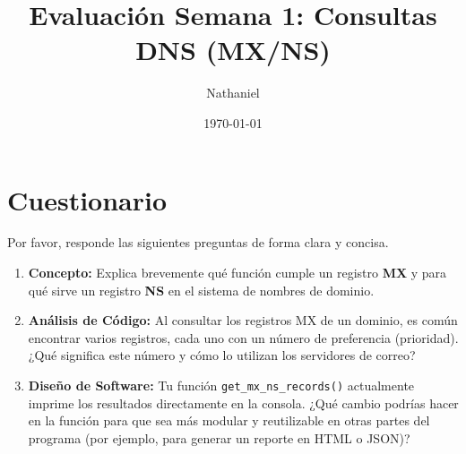\documentclass{article}
\title{Evaluación Semana 1: Consultas DNS (MX/NS)}
\author{Nathaniel}
\date{\today}
\begin{document}
\maketitle

\section*{Cuestionario}

Por favor, responde las siguientes preguntas de forma clara y concisa.

\begin{enumerate}
    \item \textbf{Concepto:} Explica brevemente qué función cumple un registro \textbf{MX} y para qué sirve un registro \textbf{NS} en el sistema de nombres de dominio.

    \item \textbf{Análisis de Código:} Al consultar los registros MX de un dominio, es común encontrar varios registros, cada uno con un número de preferencia (prioridad). ¿Qué significa este número y cómo lo utilizan los servidores de correo?

    \item \textbf{Diseño de Software:} Tu función \texttt{get\_mx\_ns\_records()} actualmente imprime los resultados directamente en la consola. ¿Qué cambio podrías hacer en la función para que sea más modular y reutilizable en otras partes del programa (por ejemplo, para generar un reporte en HTML o JSON)?

\end{enumerate}
\end{document}
